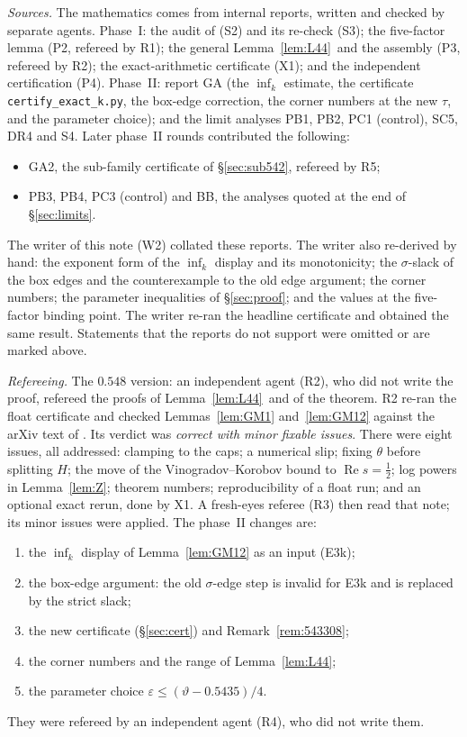 \documentclass[11pt]{amsart}
\theoremstyle{definition}
\theoremstyle{remark}
\newcommand{\e}{\varepsilon}
\newcommand{\Lfp}{Lemma~\ref{lem:L44}}
\begin{document}
\emph{Sources.} The mathematics comes from internal reports, written and checked by separate agents. Phase~I: the audit of \cite{MT} (S2) and
its re-check (S3); the five-factor lemma (P2, refereed by R1); the general \Lfp\ and the assembly (P3, refereed by R2); the exact-arithmetic
certificate (X1); and the independent certification (P4). Phase~II: report GA (the $\inf_k$ estimate, the certificate
\texttt{certify\_exact\_k.py}, the box-edge correction, the corner numbers at the new $\tau$, and the parameter choice); and the limit analyses PB1,
PB2, PC1 (control), SC5, DR4 and S4. Later phase~II rounds contributed the following:
\begin{itemize}[leftmargin=*]
\item GA2, the sub-family certificate of \S\ref{sec:sub542}, refereed by R5;
\item PB3, PB4, PC3 (control) and BB, the analyses quoted at the end of \S\ref{sec:limits}.
\end{itemize}
The writer of this note (W2) collated these reports. The writer also re-derived by hand: the exponent form
of the $\inf_k$ display and its monotonicity; the $\sigma$-slack of the box edges and the counterexample to the old edge argument; the corner
numbers; the parameter inequalities of \S\ref{sec:proof}; and the values at the five-factor binding point. The writer re-ran the headline
certificate and obtained the same result. Statements that the reports do not support were omitted or are marked above.

\emph{Refereeing.} The $0.548$ version: an independent agent (R2), who did not write the proof, refereed the proofs of \Lfp\ and of the
theorem. R2 re-ran the float certificate and checked Lemmas~\ref{lem:GM1} and~\ref{lem:GM12} against the arXiv text of \cite{GM}. Its
verdict was \emph{correct with minor fixable issues}. There were eight issues, all addressed: clamping to the caps; a numerical slip; fixing
$\theta$ before splitting $H$; the move of the Vinogradov--Korobov bound to $\operatorname{Re}s=\frac12$; log powers in Lemma~\ref{lem:Z};
theorem numbers; reproducibility of a float run; and an optional exact rerun, done by X1. A fresh-eyes referee (R3) then read that note; its
minor issues were applied. The phase~II changes are:
\begin{enumerate}[label=(\arabic*),leftmargin=*]
\item the $\inf_k$ display of Lemma~\ref{lem:GM12} as an input (E3k);
\item the box-edge argument: the old $\sigma$-edge step is invalid for E3k and is replaced by the strict slack;
\item the new certificate (\S\ref{sec:cert}) and Remark~\ref{rem:543308};
\item the corner numbers and the range of \Lfp;
\item the parameter choice $\e\le(\vartheta-0.5435)/4$.
\end{enumerate}
They were refereed by an independent agent (R4), who did not write them.
\end{document}

